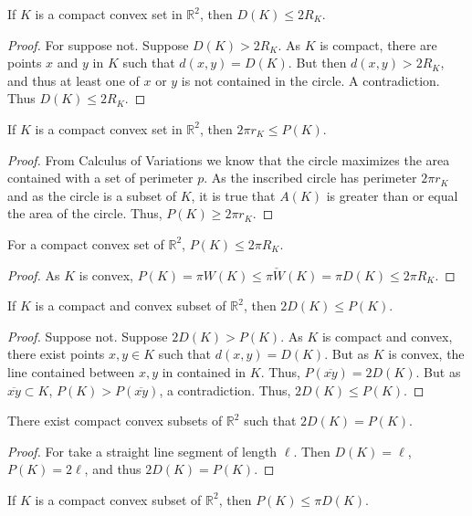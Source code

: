 \documentclass[crop=false,class=book]{standalone}
\begin{document}
\begin{theorem}
If $K$ is a compact convex set in $\mathbb{R}^2$, then $D(K) \leq 2R_K$.
\end{theorem}
\begin{proof}
For suppose not. Suppose $D(K) > 2R_K$. As $K$ is compact, there are points $x$ and $y$ in $K$ such that $d(x,y)=D(K)$. But then $d(x,y)>2R_K$, and thus at least one of $x$ or $y$ is not contained in the circle. A contradiction. Thus $D(K)\leq 2R_K$.
\end{proof}
\begin{theorem}
If $K$ is a compact convex set in $\mathbb{R}^2$, then $2\pi r_K \leq P(K)$.
\end{theorem}
\begin{proof}
From Calculus of Variations we know that the circle maximizes the area contained with a set of perimeter $p$. As the inscribed circle has perimeter $2\pi r_K$ and as the circle is a subset of $K$, it is true that $A(K)$ is greater than or equal the area of the circle. Thus, $P(K)\geq 2\pi r_K$.
\end{proof}
\begin{theorem}
For a compact convex set of $\mathbb{R}^2$, $P(K) \leq 2\pi R_K$.
\end{theorem}
\begin{proof}
As $K$ is convex, $P(K) = \pi W(K) \leq \pi \check{W}(K) = \pi D(K) \leq 2\pi R_K$.
\end{proof}
\begin{theorem}
If $K$ is a compact and convex subset of $\mathbb{R}^2$, then $2D(K)\leq P(K)$.
\end{theorem}
\begin{proof}
Suppose not. Suppose $2D(K) >P(K)$. As $K$ is compact and convex, there exist points $x,y\in K$ such that $d(x,y) = D(K)$. But as $K$ is convex, the line contained between $x,y$ in contained in $K$. Thus, $P(\overline{xy}) = 2D(K)$. But as $\overline{xy}\subset K$, $P(K)>P(\overline{xy})$, a contradiction. Thus, $2D(K) \leq P(K)$.
\end{proof}
\begin{theorem}
There exist compact convex subsets of $\mathbb{R}^2$ such that $2D(K) = P(K)$.
\end{theorem}
\begin{proof}
For take a straight line segment of length $\ell$. Then $D(K) = \ell$, $P(K) = 2\ell$, and thus $2D(K) = P(K)$.
\end{proof}
\begin{theorem}
If $K$ is a compact convex subset of $\mathbb{R}^2$, then $P(K) \leq \pi D(K)$.
\end{theorem}
\end{document}
